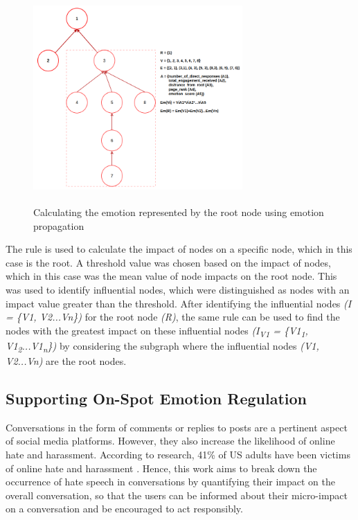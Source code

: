 \documentclass[acmtog]{acmart}
\begin{document}
\begin{figure}[h]
  
    \centering
    \includegraphics[width=8cm,height=8cm,keepaspectratio]{desc.png}
  \caption{Calculating the emotion represented by the root node using emotion propagation}
  \label{fig:desc}
  \end{figure}
The rule is used to calculate the impact of nodes on a specific node, which in this case is the root. A threshold value was chosen based on the impact of nodes, which in this case was the mean value of node impacts on the root node. This was used to identify influential nodes, which were distinguished as nodes with an impact value greater than the threshold. After identifying the influential nodes \textit{(I = \{V1, V2...Vn\})} for the root node \textit{(R)}, the same rule can be used to find the nodes with the greatest impact on these influential nodes  \textit{(I\textsubscript{V1} = \{V1\textsubscript{1}, V1\textsubscript{2}...V1\textsubscript{n}\})} by considering the subgraph where the influential nodes \textit{(V1, V2...Vn)} are the root nodes.



\subsection{Supporting On-Spot Emotion Regulation}
Conversations in the form of comments or replies to posts are a pertinent aspect of social media platforms. However, they also increase the likelihood of online hate and harassment. According to research, 41\% of US adults have been victims of online hate and harassment \cite{thomas2022s}. Hence, this work aims to break down the occurrence of hate speech in conversations by quantifying their impact on the overall conversation, so that the users can be informed about their micro-impact on a conversation and be encouraged to act responsibly.
\end{document}
